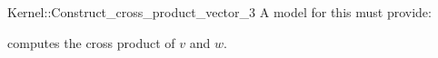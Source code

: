 \begin{ccRefFunctionObjectConcept}{Kernel::Construct_cross_product_vector_3}
A model for this must provide:



 	    {computes the cross product of $v$ and $w$.}

\end{ccRefFunctionObjectConcept}
